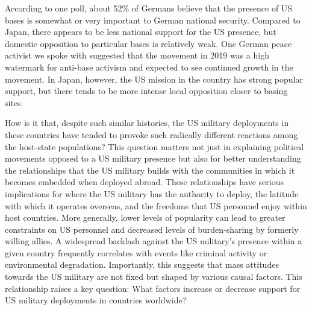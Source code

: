 
According to one poll, about 52\% of Germans believe that the presence of US bases is somewhat or very important to German national security.\autocite{Gramlich2020} Compared to Japan, there appears to be less national support for the US presence, but domestic opposition to particular bases is relatively weak. One German peace activist we spoke with suggested that the movement in 2019 was a high watermark for anti-base activism and expected to see continued growth in the movement. In Japan, however, the US mission in the country has strong popular support, but there tends to be more intense local opposition closer to basing sites. 


How is it that, despite such similar histories, the US military deployments in these countries have tended to provoke such radically different reactions among the host-state populations? This question matters not just in explaining political movements opposed to a US military presence but also for better understanding the relationships that the US military builds with the communities in which it becomes embedded when deployed abroad. These relationships have serious implications for where the US military has the authority to deploy, the latitude with which it operates overseas, and the freedoms that US personnel enjoy within host countries. More generally, lower levels of popularity can lead to greater constraints on US personnel and decreased levels of burden-sharing by formerly willing allies. A widespread backlash against the US military's presence within a given country frequently correlates with events like criminal activity or environmental degradation. Importantly, this suggests that mass attitudes towards the US military are not fixed but shaped by various causal factors. This relationship raises a key question: What factors increase or decrease support for US military deployments in countries worldwide?  %


